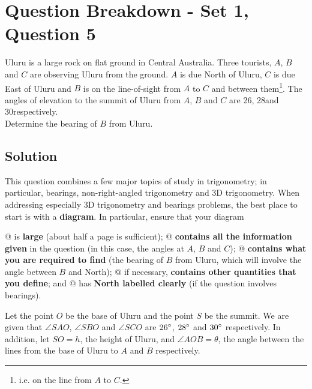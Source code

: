 \documentclass[a4paper,11pt]{article}
\begin{document}
\section*{Question Breakdown - Set 1, Question 5}
Uluru is a large rock on flat ground in Central Australia. Three tourists, $A$, $B$ and $C$ are observing Uluru from the ground. $A$ is due North of Uluru, $C$ is due East of Uluru and $B$ is on the line-of-sight from $A$ to $C$ and between them\footnote{i.e. on the line from $A$ to $C$.}. The angles of elevation to the summit of Uluru from $A$, $B$ and $C$ are 26\degrees, 28\degree and 30\degree respectively.\\

\noindent Determine the bearing of $B$ from Uluru.
\subsection*{Solution}
This question combines a few major topics of study in trigonometry; in particular, bearings, non-right-angled trigonometry and 3D trigonometry. When addressing especially 3D trigonometry and bearings problems, the best place to start is with a \textbf{diagram}. In particular, ensure that your diagram 
\vspace{0.15cm}
\begin{easylist}[itemize]
@ is \textbf{large} (about half a page is sufficient);
@ \textbf{contains all the information given} in the question (in this case, the angles at $A$, $B$ and $C$);
@ \textbf{contains what you are required to find} (the bearing of $B$ from Uluru, which will involve the angle between $B$ and North);
@ if necessary, \textbf{contains other quantities that you define}; and
@ has \textbf{North labelled clearly} (if the question involves bearings).\\
\end{easylist}
\vspace{0.15cm}

\noindent Let the point $O$ be the base of Uluru and the point $S$ be the summit. We are given that $\angle SAO$, $\angle SBO$ and $\angle SCO$ are $26\degree$, $28\degree$ and $30\degree$ respectively. In addition, let $SO=h$, the height of Uluru, and $\angle AOB=\theta$, the angle between the lines from the base of Uluru to $A$ and $B$ respectively. 
\end{document}
